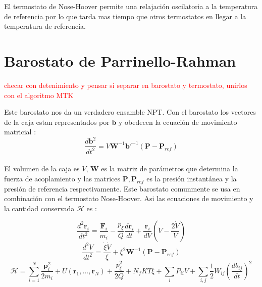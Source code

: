 El termostato de Nose-Hoover permite una relajación oscilatoria a la temperatura de referencia por lo que tarda mas tiempo que otros termostatos en llegar a la temperatura de referencia.\\

\section{Barostato de Parrinello-Rahman}\textcolor{red}{checar con detenimiento y pensar si separar en barostato y termostato, unirlos con el algoritmo MTK}

Este barostato nos da un verdadero ensamble NPT. Con el barostato los vectores de la caja estan representados por $\mathbf{b}$ y obedecen la ecuación de movimiento matricial\cite{gromacsdoc} \cite{simone1993}:\\

\begin{equation} \label{parrrahman}
    \frac{d\mathbf{b}^2}{dt^2}=V\mathbf{W}^{-1}\mathbf{b'}^{-1}(\mathbf{P}-\mathbf{P}_{ref})
\end{equation}\\

El volumen de la caja es $V$, $\mathbf{W}$ es la matriz de parámetros que determina la fuerza de acoplamiento y las matrices $\mathbf{P},\mathbf{P}_{ref}$ es la presión instantánea y la presión de referencia respectivamente. Este barostato comunmente se usa en combinación con el termostato Nose-Hoover. Asi las ecuaciones de movimiento y la cantidad conservada $\mathcal{H}$ es \cite{gromacsdoc}:

\begin{equation} \label{NHPRmotionr}
    \frac{d^2\mathbf{r}_i}{dt^2} = \frac{\mathbf{F}_i}{m_i}-\frac{p_\xi}{Q}\frac{d\mathbf{r}_i}{dt} + \frac{\mathbf{r}_i}{dV}\left(\ddot{V}-\frac{2\dot{V}}{V}\right)
\end{equation}
\begin{equation} \label{NHPRmotionV}
    \frac{d^2 V}{dt^2} = \frac{\dot{\xi}\dot{V}}{\xi} + \xi^2\mathbf{W}^{-1}(\mathbf{P}-\mathbf{P}_{ref})
\end{equation}
\begin{equation} \label{conservedNoseHooverParrRahm}
    \mathcal{H} = \sum_{i=1}^{N}\frac{\mathbf{p}_i^2}{2m_i} + U(\mathbf{r}_1,...,\mathbf{r}_N)+\frac{p_\xi^2}{2Q} + N_fKT\xi + \sum_i P_{ii}V + \sum_{i,j}\frac{1}{2}W_{ij}\left(\frac{db_{ij}}{dt}\right)^2
\end{equation}\\

